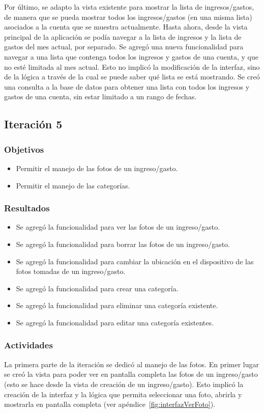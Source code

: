 Por último, se adapto la vista existente para mostrar la lista de ingresos/gastos, de manera que se pueda mostrar todos los ingresos/gastos (en una misma lista) asociados a la cuenta que se muestra actualmente. Hasta ahora, desde la vista principal de la aplicación se podía navegar a la lista de ingresos y la lista de gastos del mes actual, por separado. Se agregó una nueva funcionalidad para navegar a una lista que contenga todos los ingresos y gastos de una cuenta, y que no esté limitada al mes actual. Esto no implicó la modificación de la interfaz, sino de la lógica a través de la cual se puede saber qué lista se está mostrando. Se creó una consulta a la base de datos para obtener una lista con todos los ingresos y gastos de una cuenta, sin estar limitado a un rango de fechas.

\subsection{Iteración 5}
\subsubsection{Objetivos}
\begin{itemize}
\item Permitir el manejo de las fotos de un ingreso/gasto.
\item Permitir el manejo de las categorías.
\end{itemize}

\subsubsection{Resultados}
\begin{itemize}
\item Se agregó la funcionalidad para ver las fotos de un ingreso/gasto.
\item Se agregó la funcionalidad para borrar las fotos de un ingreso/gasto.
\item Se agregó la funcionalidad para cambiar la ubicación en el dispositivo de las fotos tomadas de un ingreso/gasto.
\item Se agregó la funcionalidad para crear una categoría.
\item Se agregó la funcionalidad para eliminar una categoría existente.
\item Se agregó la funcionalidad para editar una categoría existentes.
\end{itemize}

\subsubsection{Actividades}
La primera parte de la iteración se dedicó al manejo de las fotos. En primer lugar se creó la vista para poder ver en pantalla completa las fotos de un ingreso/gasto (esto se hace desde la vista de creación de un ingreso/gasto). Esto implicó la creación de la interfaz y la lógica que permita seleccionar una foto, abrirla y mostrarla en pantalla completa (ver apéndice~\ref{fig:interfazVerFoto}).

